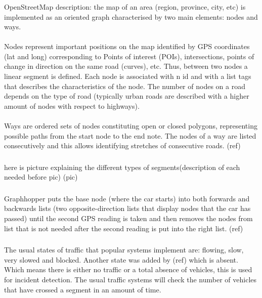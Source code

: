 \documentclass[12pt,a4paper]{article}
\begin{document}
\subsubsection{}
OpenStreetMap description: the map of an area (region, province, city, etc) is implemented as an oriented graph characterised by two main elements: nodes and ways.
\paragraph{}
Nodes represent important positions on the map identified by GPS coordinates (lat and long) corresponding to Points of interest (POIs), intersections, points of change in direction on the same road (curves), etc. Thus, between two nodes a linear segment is defined. Each node is associated with n id and with a list tags that describes the characteristics of the node. The number of nodes on a road depends on the type of road (typically urban roads are described with a higher amount of nodes with respect to highways).
\paragraph{}
Ways are ordered sets of nodes constituting open or closed polygons, representing possible paths from the start node to the end note. The nodes of a way are listed consecutively and this allows identifying stretches of consecutive roads. (ref) 

\subsubsection{}
here is picture explaining the different types of segments(description of each needed before pic)
(pic)

\subsubsection{}
Graphhopper puts the base node (where the car starts) into both forwards and backwards lists (two opposite-direction lists that display nodes that the car has passed) until the second GPS reading is taken and then removes the nodes from list that is not needed after the second reading is put into the right list. (ref)

\subsubsection{}
The usual states of traffic that popular systems implement are: flowing, slow, very slowed and blocked. Another state was added by (ref) which is absent. Which means there is either no traffic or a total absence of vehicles, this is used for incident detection. The usual traffic systems will check the number of vehicles that have crossed a segment in an amount of time.
\end{document}
